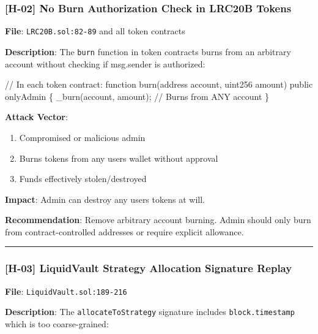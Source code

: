 \documentclass[
]{article}
\newenvironment{Shaded}{}{}
\newcommand{\NormalTok}[1]{#1}
\providecommand{\tightlist}{%
  \setlength{\itemsep}{0pt}\setlength{\parskip}{0pt}}
\begin{document}
\subsubsection{{[}H-02{]} No Burn Authorization Check in LRC20B
Tokens}\label{h-02-no-burn-authorization-check-in-lrc20b-tokens}

\textbf{File}: \texttt{LRC20B.sol:82-89} and all token contracts

\textbf{Description}: The \texttt{burn} function in token contracts
burns from an arbitrary account without checking if msg.sender is
authorized:

\begin{Shaded}
\begin{Highlighting}[]
\NormalTok{// In each token contract:}
\NormalTok{function burn(address account, uint256 amount) public onlyAdmin \{}
\NormalTok{    \_burn(account, amount);  // Burns from ANY account}
\NormalTok{\}}
\end{Highlighting}
\end{Shaded}

\textbf{Attack Vector}:

\begin{enumerate}
\def\labelenumi{\arabic{enumi}.}
\tightlist
\item
  Compromised or malicious admin
\item
  Burns tokens from any user\textquotesingle s wallet without approval
\item
  Funds effectively stolen/destroyed
\end{enumerate}

\textbf{Impact}: Admin can destroy any user\textquotesingle s tokens at
will.

\textbf{Recommendation}: Remove arbitrary account burning. Admin should
only burn from contract-controlled addresses or require explicit
allowance.

\begin{center}\rule{0.5\linewidth}{0.5pt}\end{center}

\subsubsection{{[}H-03{]} LiquidVault Strategy Allocation Signature
Replay}\label{h-03-liquidvault-strategy-allocation-signature-replay}

\textbf{File}: \texttt{LiquidVault.sol:189-216}

\textbf{Description}: The \texttt{allocateToStrategy} signature includes
\texttt{block.timestamp} which is too coarse-grained:
\end{document}
